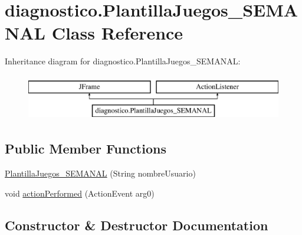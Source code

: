\hypertarget{classdiagnostico_1_1_plantilla_juegos___s_e_m_a_n_a_l}{}\section{diagnostico.\+Plantilla\+Juegos\+\_\+\+S\+E\+M\+A\+N\+AL Class Reference}
\label{classdiagnostico_1_1_plantilla_juegos___s_e_m_a_n_a_l}
Inheritance diagram for diagnostico.\+Plantilla\+Juegos\+\_\+\+S\+E\+M\+A\+N\+AL\+:\begin{figure}[H]
\begin{center}
\leavevmode
\includegraphics[height=2.000000cm]{classdiagnostico_1_1_plantilla_juegos___s_e_m_a_n_a_l}
\end{center}
\end{figure}
\subsection*{Public Member Functions}
\begin{DoxyCompactItemize}
\item 
\mbox{\hyperlink{classdiagnostico_1_1_plantilla_juegos___s_e_m_a_n_a_l_a1737928e749f0407ae4a4b2a9f454d8f}{Plantilla\+Juegos\+\_\+\+S\+E\+M\+A\+N\+AL}} (String nombre\+Usuario)
\item 
void \mbox{\hyperlink{classdiagnostico_1_1_plantilla_juegos___s_e_m_a_n_a_l_a7a221c980d95773abe66602699acab63}{action\+Performed}} (Action\+Event arg0)
\end{DoxyCompactItemize}


\subsection{Constructor \& Destructor Documentation}
\mbox{\label{classdiagnostico_1_1_plantilla_juegos___s_e_m_a_n_a_l_a1737928e749f0407ae4a4b2a9f454d8f}} 
